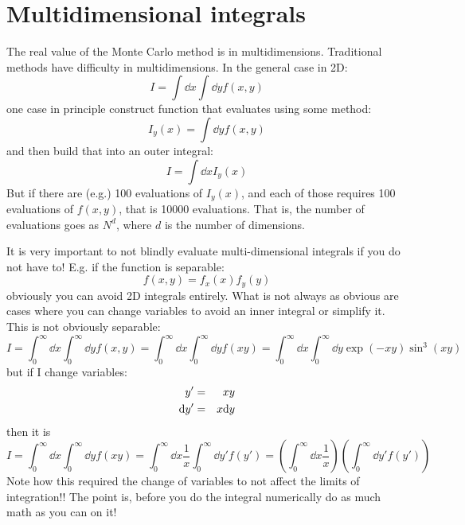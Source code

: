 \section{Multidimensional integrals}

The real value of the Monte Carlo method is in
multidimensions. Traditional methods have difficulty in
multidimensions. In the general case in 2D:
\begin{equation}
I = \int \dd{x} \int \dd{y} f(x, y)
\end{equation}
one case in principle construct function that evaluates using some
method:
\begin{equation}
I_y(x) = \int \dd{y} f(x, y)
\end{equation}
and then build that into an outer integral:
\begin{equation}
I = \int \dd{x} I_y(x)
\end{equation}
But if there are (e.g.) 100 evaluations of $I_y(x)$, and each of those
requires 100 evaluations of $f(x,y)$, that is 10000 evaluations. That
is, the number of evaluations goes as $N^d$, where $d$ is the number
of dimensions. 

It is very important to not blindly evaluate multi-dimensional
integrals if you do not have to! E.g. if the function is separable:
\begin{equation}
f(x, y) = f_x(x) f_y(y)
\end{equation}
obviously you can avoid 2D integrals entirely. What is not always as
obvious are cases where you can change variables to avoid an inner
integral or simplify it. This is not obviously separable:
\begin{equation}
  I = \int_0^\infty \dd{x} \int_0^\infty \dd{y} f(x, y) =
  \int_0^\infty \dd{x} \int_0^\infty \dd{y} f(xy) =
  \int_0^\infty \dd{x} \int_0^\infty \dd{y} \exp(- xy) \sin^3(xy)
\end{equation}
but if I change variables:
\begin{eqnarray}
y' &=& xy \cr
{\rm d}y' &=& x{\rm d}y
\end{eqnarray}
then it is
\begin{equation}
  I = \int_0^\infty \dd{x} \int_0^\infty \dd{y} f(xy) =
  \int_0^\infty \dd{x} \frac{1}{x} \int_0^\infty \dd{y'} f(y') =
  \left(\int_0^\infty \dd{x} \frac{1}{x}\right)
  \left(\int_0^\infty \dd{y'} f(y') \right)
\end{equation}
Note how this required the change of variables to not affect the
limits of integration!! The point is, before you do the integral
numerically do as much math as you can on it!

